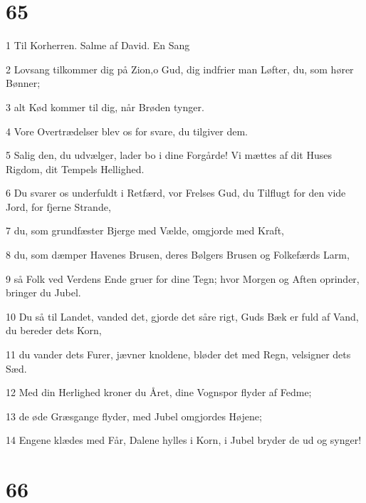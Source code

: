 \chapter{65}

\par 1 Til Korherren. Salme af David. En Sang
\par 2 Lovsang tilkommer dig på Zion,o Gud, dig indfrier man Løfter, du, som hører Bønner;
\par 3 alt Kød kommer til dig, når Brøden tynger.
\par 4 Vore Overtrædelser blev os for svare, du tilgiver dem.
\par 5 Salig den, du udvælger, lader bo i dine Forgårde! Vi mættes af dit Huses Rigdom, dit Tempels Hellighed.
\par 6 Du svarer os underfuldt i Retfærd, vor Frelses Gud, du Tilflugt for den vide Jord, for fjerne Strande,
\par 7 du, som grundfæster Bjerge med Vælde, omgjorde med Kraft,
\par 8 du, som dæmper Havenes Brusen, deres Bølgers Brusen og Folkefærds Larm,
\par 9 så Folk ved Verdens Ende gruer for dine Tegn; hvor Morgen og Aften oprinder, bringer du Jubel.
\par 10 Du så til Landet, vanded det, gjorde det såre rigt, Guds Bæk er fuld af Vand, du bereder dets Korn,
\par 11 du vander dets Furer, jævner knoldene, bløder det med Regn, velsigner dets Sæd.
\par 12 Med din Herlighed kroner du Året, dine Vognspor flyder af Fedme;
\par 13 de øde Græsgange flyder, med Jubel omgjordes Højene;
\par 14 Engene klædes med Får, Dalene hylles i Korn, i Jubel bryder de ud og synger!

\chapter{66}

